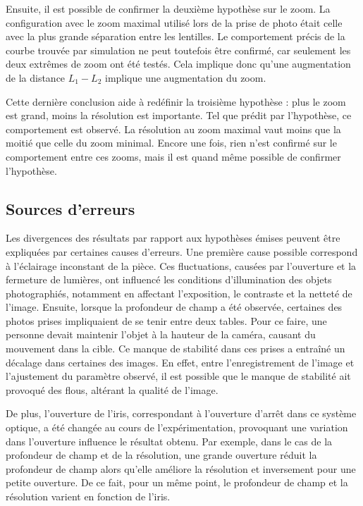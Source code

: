 \documentclass[11pt,letterpaper]{article}
\begin{document}

Ensuite, il est possible de confirmer la deuxième hypothèse sur le zoom. La
configuration avec le zoom maximal utilisé lors de la prise de photo était celle avec
la plus grande séparation entre les lentilles. Le comportement précis de la courbe
trouvée par simulation ne peut toutefois être confirmé, car seulement les deux extrêmes
de zoom ont été testés. Cela implique donc qu'une augmentation de la distance $L_1 - L_2$ implique une augmentation du zoom.

Cette dernière conclusion aide à redéfinir la troisième hypothèse : plus le zoom est
grand, moins la résolution est importante. Tel que prédit par l'hypothèse, ce comportement
est observé. La résolution au zoom maximal vaut moins que la moitié que celle du zoom minimal. Encore
une fois, rien n'est confirmé sur le comportement entre ces zooms, mais il est quand même possible de
confirmer l'hypothèse.

\subsection{Sources d'erreurs}
Les divergences des résultats par rapport aux hypothèses émises peuvent être expliquées par certaines causes d'erreurs. Une première cause possible correspond à l'éclairage inconstant de la pièce. Ces fluctuations, causées par l'ouverture et la fermeture de lumières, ont influencé les conditions d'illumination des objets photographiés, notamment en affectant l'exposition, le contraste et la netteté de l'image. Ensuite, lorsque la profondeur de champ a été observée, certaines des photos prises impliquaient de se tenir entre deux tables. Pour ce faire, une personne devait maintenir l'objet à la hauteur de la caméra, causant du mouvement dans la cible. Ce manque de stabilité dans ces prises a entraîné un décalage dans certaines des images. En effet, entre l'enregistrement de l'image et l'ajustement du paramètre observé, il est possible que le manque de stabilité ait provoqué des flous, altérant la qualité de l'image. 

De plus, l'ouverture de l'iris, correspondant à l'ouverture d'arrêt dans ce système optique, a été changée au cours de l'expérimentation, provoquant une variation dans l'ouverture influence le résultat obtenu. Par exemple, dans le cas de la profondeur de champ et de la résolution, une grande ouverture réduit la profondeur de champ alors qu'elle améliore la résolution et inversement pour une petite ouverture. De ce fait, pour un même point, le profondeur de champ et la résolution varient en fonction de l'iris.
\end{document}
